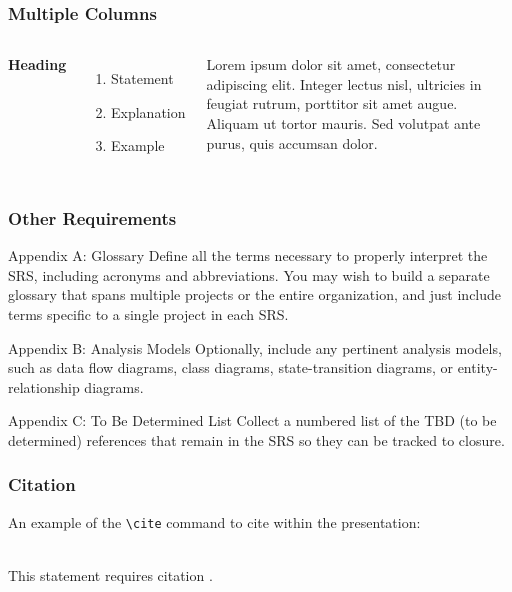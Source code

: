 \documentclass{beamer}
\begin{document}
\begin{frame}
\frametitle{Multiple Columns}
\begin{columns}[c] %

\textbf{Heading}
\begin{enumerate}
\item Statement
\item Explanation
\item Example
\end{enumerate}

Lorem ipsum dolor sit amet, consectetur adipiscing elit. Integer lectus nisl, ultricies in feugiat rutrum, porttitor sit amet augue. Aliquam ut tortor mauris. Sed volutpat ante purus, quis accumsan dolor.

\end{columns}
\end{frame}



\begin{frame}
\frametitle{Other Requirements}
\begin{block}{Appendix A: Glossary}
Define all the terms necessary to properly interpret the SRS, including acronyms and abbreviations. You may wish to build a separate glossary that spans multiple projects or the entire organization, and just include terms specific to a single project in each SRS.
\end{block}

\begin{block}{Appendix B: Analysis Models}
Optionally, include any pertinent analysis models, such as data  flow diagrams, class diagrams, state-transition diagrams, or entity-relationship diagrams.
\end{block}

\begin{block}{Appendix C: To Be Determined List}
Collect a numbered list of the TBD (to be determined) references that remain in the SRS so they can be tracked to closure.
\end{block}
\end{frame}

\begin{frame}[fragile] %
\frametitle{Citation}
An example of the \verb|\cite| command to cite within the presentation:\\~

This statement requires citation \cite{p1}.


\end{frame}
\end{document}
